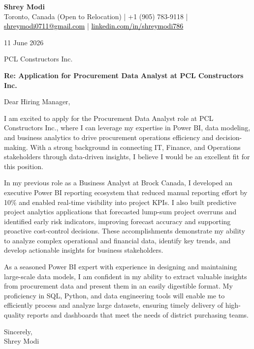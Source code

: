 \documentclass[11pt,letterpaper]{article}
\begin{document}
\begin{center}
  {\Large \bfseries \color{accent} Shrey Modi}\\[0.2em]
  {\small Toronto, Canada (Open to Relocation) | +1 (905) 783-9118 | \href{mailto:shreymodi0711@gmail.com}{\textcolor{black}{shreymodi0711@gmail.com}} | \href{https://linkedin.com/in/shreymodi786}{\textcolor{black}{linkedin.com/in/shreymodi786}}}
\end{center}

\vspace{1em}

11 June 2026

\vspace{0.5em}

PCL Constructors Inc.\\
\vspace{0.5em}

\textbf{Re: Application for Procurement Data Analyst at PCL Constructors Inc.}

Dear Hiring Manager,

I am excited to apply for the Procurement Data Analyst role at PCL Constructors Inc., where I can leverage my expertise in Power BI, data modeling, and business analytics to drive procurement operations efficiency and decision-making. With a strong background in connecting IT, Finance, and Operations stakeholders through data-driven insights, I believe I would be an excellent fit for this position.

In my previous role as a Business Analyst at Brock Canada, I developed an executive Power BI reporting ecosystem that reduced manual reporting effort by 10\% and enabled real-time visibility into project KPIs. I also built predictive project analytics applications that forecasted lump-sum project overruns and identified early risk indicators, improving forecast accuracy and supporting proactive cost-control decisions. These accomplishments demonstrate my ability to analyze complex operational and financial data, identify key trends, and develop actionable insights for business stakeholders.

As a seasoned Power BI expert with experience in designing and maintaining large-scale data models, I am confident in my ability to extract valuable insights from procurement data and present them in an easily digestible format. My proficiency in SQL, Python, and data engineering tools will enable me to efficiently process and analyze large datasets, ensuring timely delivery of high-quality reports and dashboards that meet the needs of district purchasing teams.

Sincerely,\\
Shrey Modi
\end{document}
